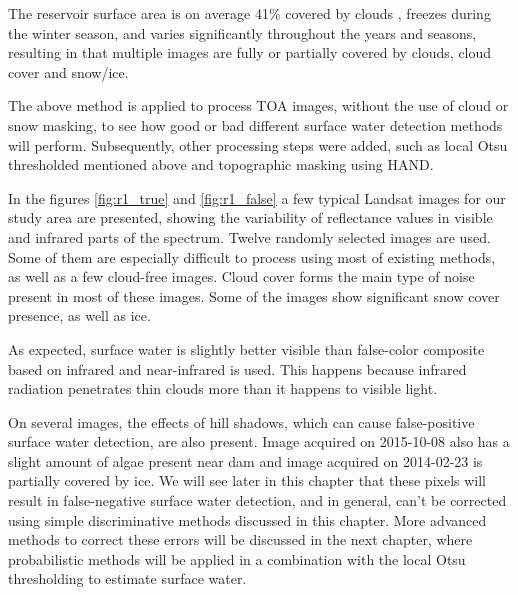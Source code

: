 The reservoir surface area is on average 41\% covered by clouds \cite{wilson2016remotely}, freezes during the winter season, and varies significantly throughout the years and seasons, resulting in that multiple images are fully or partially covered by clouds, cloud cover and snow/ice.

The above method is applied to process TOA images, without the use of cloud or snow masking, to see how good or bad different surface water detection methods will perform. Subsequently, other processing steps were added, such as local Otsu thresholded mentioned above and topographic masking using HAND. 


In the figures \ref{fig:r1_true} and \ref{fig:r1_false} a few typical Landsat images for our study area are presented, showing the variability of reflectance values in visible and infrared parts of the spectrum. Twelve randomly selected images are used. Some of them are especially difficult to process using most of existing methods, as well as a few cloud-free images. Cloud cover forms the main type of noise present in most of these images. Some of the images show significant snow cover presence, as well as ice. 

As expected, surface water is slightly better visible than false-color composite based on infrared and near-infrared is used. This happens because infrared radiation penetrates thin clouds more than it happens to visible light. 

On several images, the effects of hill shadows, which can cause false-positive surface water detection, are also present. Image acquired on 2015-10-08 also has a slight amount of algae present near dam and image acquired on 2014-02-23 is partially covered by ice. We will see later in this chapter that these pixels will result in false-negative surface water detection, and in general, can't be corrected using simple discriminative methods discussed in this chapter. More advanced methods to correct these errors will be discussed in the next chapter, where probabilistic methods will be applied in a combination with the local Otsu thresholding to estimate surface water.


